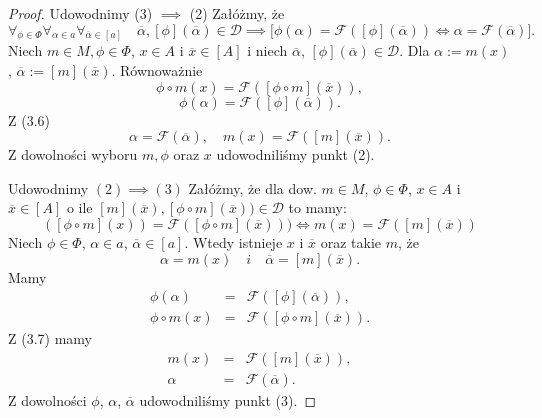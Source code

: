 \documentclass[12pt,a4paper]{report}
\newcommand{\domkniecie}[1]{\left[ {#1} \right] }
\begin{document}
\begin{proof}
Udowodnimy (3) $\implies$ (2)
Załóżmy, że
\begin{equation}
\forall_{\phi \in \Phi}\forall_{\alpha \in a}\forall_{\overline{\alpha} \in \domkniecie{a}} \quad \overline{\alpha}, \domkniecie{\phi}(\overline{\alpha}) \in \mathcal{D} \implies \big[\phi(\alpha)=\mathcal{F}(\domkniecie{\phi}(\overline{\alpha})) \iff \alpha=\mathcal{F}(\overline{\alpha})\big].
\end{equation}
Niech $m\in M, \phi\in \Phi$, $x\in A$ i $\overline{x} \in \domkniecie{A}$ i niech $\overline{\alpha}$, $\domkniecie{\phi}(\overline{\alpha}) \in \mathcal{D}$. Dla  $\alpha:= m(x)$, $\overline{\alpha}:=\domkniecie{m}(\overline{x})$. Równoważnie
$$
\phi\circ m(x)=\mathcal{F}(\domkniecie{\phi\circ m}(\overline{x})), 
$$
$$
\phi(\alpha)=\mathcal{F}(\domkniecie{\phi}(\overline{\alpha})).
$$
Z (3.6)
$$
\alpha=\mathcal{F}(\overline{\alpha}), \quad m(x)=\mathcal{F}(\domkniecie{m}(\overline{x})).
$$
Z dowolności wyboru $m, \phi$ oraz $x$ udowodniliśmy punkt (2).

Udowodnimy $(2) \implies (3)$
Załóżmy, że dla dow. $m \in M$, $\phi \in \Phi$, $ x \in A$ i $\overline{x} \in \domkniecie{A}$ o ile $\domkniecie{m}(\overline{x}), \domkniecie{\phi\circ m}(\overline{x})) \in \mathcal{D}$ to mamy:
\begin{equation}
(\domkniecie{\phi\circ m}(x))=\mathcal{F}( \domkniecie{\phi \circ m}(\overline{x}))) \iff m(x)=\mathcal{F}(\domkniecie{m}(\overline{x}))
\end{equation}
Niech $\phi \in \Phi$, $\alpha \in a$, $\overline{\alpha} \in \domkniecie{a}$. Wtedy istnieje $x$ i $\overline{x}$ oraz takie $m$, że
$$
\alpha=m(x) \quad i \quad \overline{\alpha}=\domkniecie{m}(\overline{x}).
$$ 
Mamy
\begin{eqnarray*}
\phi(\alpha) & = & \mathcal{F}(\domkniecie{\phi}(\overline{\alpha})),\\
\phi \circ m(x)&=&\mathcal{F}(\domkniecie{\phi \circ m}(\overline{x})).
\end{eqnarray*}
Z (3.7) mamy
\begin{eqnarray*}
m(x) &=&\mathcal{F}(\domkniecie{m}(\overline{x})),\\
\alpha&=&\mathcal{F}(\overline{\alpha}).
\end{eqnarray*}
Z dowolności $\phi$, $\alpha$, $\overline{\alpha}$ udowodniliśmy punkt (3).
\end{proof}
\end{document}

